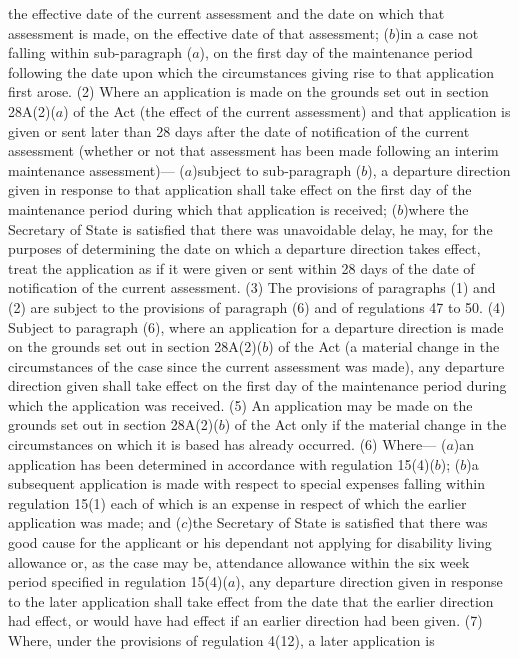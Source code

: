 \documentclass[a4paper]{article}
\begin{document}
the effective date of the current assessment and the date on which that
assessment is made, on the effective date of that assessment;
($b$)in a case not falling within sub-paragraph ($a$), on the first day of the
maintenance period following the date upon which the circumstances giving rise
to that application first arose.
(2) Where an application is made on the grounds set out in section 28A(2)($a$) of
the Act (the effect of the current assessment) and that application is given or
sent later than 28 days after the date of notification of the current assessment
(whether or not that assessment has been made following an interim maintenance
assessment)—
($a$)subject to sub-paragraph ($b$), a departure direction given in response to that
application shall take effect on the first day of the maintenance period during
which that application is received;
($b$)where the Secretary of State is satisfied that there was unavoidable delay,
he may, for the purposes of determining the date on which a departure direction
takes effect, treat the application as if it were given or sent within 28 days
of the date of notification of the current assessment.
(3) The provisions of paragraphs (1) and (2) are subject to the provisions of
paragraph (6) and of regulations 47 to 50.
(4) Subject to paragraph (6), where an application for a departure direction is
made on the grounds set out in section 28A(2)($b$) of the Act (a material change
in the circumstances of the case since the current assessment was made), any
departure direction given shall take effect on the first day of the maintenance
period during which the application was received.
(5) An application may be made on the grounds set out in section 28A(2)($b$) of
the Act only if the material change in the circumstances on which it is based
has already occurred.
(6) Where—
($a$)an application has been determined in accordance with regulation 15(4)($b$);
($b$)a subsequent application is made with respect to special expenses falling
within regulation 15(1) each of which is an expense in respect of which the
earlier application was made; and
($c$)the Secretary of State is satisfied that there was good cause for the
applicant or his dependant not applying for disability living allowance or, as
the case may be, attendance allowance within the six week period specified in
regulation 15(4)($a$),
any departure direction given in response to the later application shall take
effect from the date that the earlier direction had effect, or would have had
effect if an earlier direction had been given.
(7) Where, under the provisions of regulation 4(12), a later application is
\end{document}
